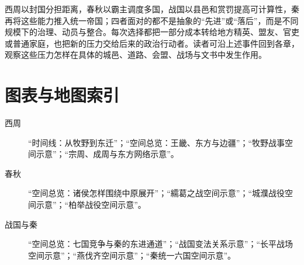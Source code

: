 \begin{turningpoint}
西周以封国分担距离，春秋以霸主调度多国，战国以县邑和赏罚提高可计算性，秦再将这些能力推入统一帝国；四者面对的都不是抽象的“先进”或“落后”，而是不同规模下的治理、动员与整合。每次选择都把一部分成本转给地方精英、盟友、官吏或普通家庭，也把新的压力交给后来的政治行动者。读者可沿上述事件回到各章，观察这些压力怎样在具体的城邑、道路、会盟、战场与文书中发生作用。
\end{turningpoint}

\section{图表与地图索引}

\begin{description}
  \item[西周] “时间线：从牧野到东迁”；“空间总览：王畿、东方与边疆”；“牧野战事空间示意”；“宗周、成周与东方网络示意”。
  \item[春秋] “空间总览：诸侯怎样围绕中原展开”；“繻葛之战空间示意”；“城濮战役空间示意”；“柏举战役空间示意”。
  \item[战国与秦] “空间总览：七国竞争与秦的东进通道”；“战国变法关系示意”；“长平战场空间示意”；“燕伐齐空间示意”；“秦统一六国空间示意”。
\end{description}
